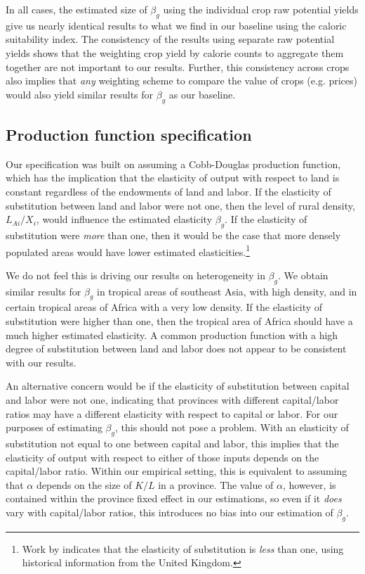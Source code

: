 \documentclass[11pt]{article}
\begin{document}
In all cases, the estimated size of $\beta_g$ using the individual crop raw potential yields give us nearly identical results to what we find in our baseline using the caloric suitability index. The consistency of the results using separate raw potential yields shows that the weighting crop yield by calorie counts to aggregate them together are not important to our results. Further, this consistency across crops also implies that \textit{any} weighting scheme to compare the value of crops (e.g. prices) would also yield similar results for $\beta_g$ as our baseline. 

\subsection{Production function specification}
Our specification was built on assuming a Cobb-Douglas production function, which has the implication that the elasticity of output with respect to land is constant regardless of the endowments of land and labor. If the elasticity of substitution between land and labor were not one, then the level of rural density, $L_{Ai}/X_i$, would influence the estimated elasticity $\beta_g$. If the elasticity of substitution were \textit{more} than one, then it would be the case that more densely populated areas would have lower estimated elasticities.\footnote{Work by \citet{wilde2012} indicates that the elasticity of substitution is \textit{less} than one, using historical information from the United Kingdom.} 

We do not feel this is driving our results on heterogeneity in $\beta_g$. We obtain similar results for $\beta_g$ in tropical areas of southeast Asia, with high density, and in certain tropical areas of Africa with a very low density. If the elasticity of substitution were higher than one, then the tropical area of Africa should have a much higher estimated elasticity. A common production function with a high degree of substitution between land and labor does not appear to be consistent with our results.

An alternative concern would be if the elasticity of substitution between capital and labor were not one, indicating that provinces with different capital/labor ratios may have a different elasticity with respect to capital or labor. For our purposes of estimating $\beta_g$, this should not pose a problem. With an elasticity of substitution not equal to one between capital and labor, this implies that the elasticity of output with respect to either of those inputs depends on the capital/labor ratio. Within our empirical setting, this is equivalent to assuming that $\alpha$ depends on the size of $K/L$ in a province. The value of $\alpha$, however, is contained within the province fixed effect in our estimations, so even if it \textit{does} vary with capital/labor ratios, this introduces no bias into our estimation of $\beta_g$.
\end{document}

